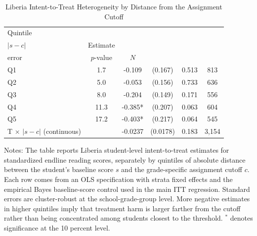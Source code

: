 \begin{table}[htbp]
\caption{Liberia Intent-to-Treat Heterogeneity by Distance from the Assignment Cutoff}
\label{tab:cutoff_het}
\begin{center}
\begin{small}
\begin{threeparttable}
\begin{tabular}{lccccc}
\toprule
Quintile & \Longstack{Mean\\ $|s-c|$} & Estimate & \Longstack{Standard\\ error} & $p$-value & $N$ \\
\midrule
Q1 & 1.7 & -0.109 & (0.167) & 0.513 & 813 \\
Q2 & 5.0 & -0.053 & (0.156) & 0.733 & 636 \\
Q3 & 8.0 & -0.204 & (0.149) & 0.171 & 556 \\
Q4 & 11.3 & -0.385* & (0.207) & 0.063 & 604 \\
Q5 & 17.2 & -0.403* & (0.217) & 0.064 & 545 \\
\midrule
T $\times$ $|s-c|$ (continuous) & & -0.0237 & (0.0178) & 0.183 & 3,154 \\
\bottomrule
\end{tabular}
\begin{tablenotes}
\footnotesize \item Notes: The table reports Liberia student-level intent-to-treat estimates for standardized endline reading scores, separately by quintiles of absolute distance between the student's baseline score $s$ and the grade-specific assignment cutoff $c$. Each row comes from an OLS specification with strata fixed effects and the empirical Bayes baseline-score control used in the main ITT regression. Standard errors are cluster-robust at the school-grade-group level. More negative estimates in higher quintiles imply that treatment harm is larger farther from the cutoff rather than being concentrated among students closest to the threshold. $^*$ denotes significance at the 10 percent level.
\end{tablenotes}
\end{threeparttable}
\end{small}
\end{center}
\end{table}